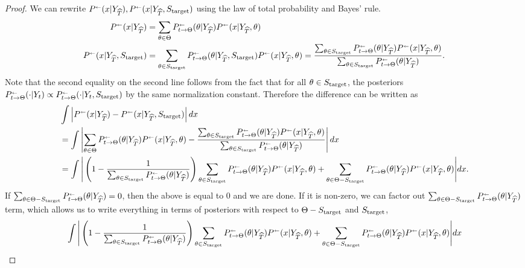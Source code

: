 \masterinequality*
\begin{proof}
We can rewrite  $\kernelreverse[](x| Y_{\wh{T}}), \kernelreverse[](x| Y_{\wh{T}},\Send)$ using the law of total probability and Bayes' rule. 
\begin{align*}
\kernelreverse[](x| Y_{\wh{T}}) &=\sum_{\theta \in \Theta} \kernelreverse[]_{t \to \Theta}(\theta|Y_{\wh{T}})\kernelreverse[](x|Y_{\wh{T}},\theta)\\
\kernelreverse[](x| Y_{\wh{T}},\Send) &=\sum_{\theta \in \Send} \kernelreverse[]_{t \to \Theta}(\theta|Y_{\wh{T}},\Send)\kernelreverse[](x|Y_{\wh{T}},\theta) = \frac{\sum_{\theta \in \Send} \kernelreverse[]_{t \to \Theta}(\theta|Y_{\wh{T}})\kernelreverse[](x|Y_{\wh{T}},\theta)}{\sum_{\theta \in \Send} \kernelreverse[]_{t \to \Theta}(\theta|Y_{\wh{T}})}.
\end{align*}
Note that the second equality on the second line follows from the fact that for all $\theta \in S_{\mathrm{target}}$, the posteriors $\kernelreverse[]_{t \to \Theta} (\cdot|Y_t) \propto \kernelreverse[]_{t \to \Theta}(\cdot|Y_t,\Send)$  by the same normalization constant. Therefore the difference can be written as 
\begin{align*}
&\int \left|\kernelreverse[](x| Y_{\wh{T}})-\kernelreverse[](x| Y_{\wh{T}},\Send)\right| dx \\
&= \int \left|\sum_{\theta \in \Theta} \kernelreverse[]_{t \to \Theta}(\theta|Y_{\wh{T}})\kernelreverse[](x|Y_{\wh{T}},\theta)-\frac{\sum_{\theta \in \Send} \kernelreverse[]_{t \to \Theta}(\theta|Y_{\wh{T}})\kernelreverse[](x|Y_{\wh{T}},\theta)}{\sum_{\theta \in \Send} \kernelreverse[]_{t \to \Theta}(\theta|Y_{\wh{T}})}\right| dx \\
&=  \int \Bigg|\left(1-\frac{1}{\sum_{\theta \in \Send} \kernelreverse[]_{t \to \Theta}(\theta|Y_{\wh{T}})}\right)\sum_{\theta \in \Send} \kernelreverse[]_{t \to \Theta}(\theta|Y_{\wh{T}})\kernelreverse[](x|Y_{\wh{T}},\theta) + \sum_{\theta \in \Theta-\Send} \kernelreverse[]_{t \to \Theta}(\theta|Y_{\wh{T}})\kernelreverse[](x|Y_{\wh{T}},\theta)\Bigg| dx. 
\end{align*}
If $\sum_{\theta \in \Theta-\Send} \kernelreverse[]_{t \to \Theta}(\theta|Y_{\wh{T}})=0$, then the above is equal to $0$ and we are done. If it is non-zero, we can factor out $\sum_{\theta \in \Theta-\Send} \kernelreverse[]_{t \to \Theta}(\theta|Y_{\wh{T}})$ term, which allows us to write everything in terms of posteriors with respect to $\Theta-S_{\mathrm{target}}$ and $S_{\mathrm{target}}$, 
\begin{align*}
&\int \Bigg|\left(1-\frac{1}{\sum_{\theta \in \Send} \kernelreverse[]_{t \to \Theta}(\theta|Y_{\wh{T}})}\right)\sum_{\theta \in \Send} \kernelreverse[]_{t \to \Theta}(\theta|Y_{\wh{T}})\kernelreverse[](x|Y_{\wh{T}},\theta) + \sum_{\theta \in \Theta-\Send} \kernelreverse[]_{t \to \Theta}(\theta|Y_{\wh{T}})\kernelreverse[](x|Y_{\wh{T}},\theta)\Bigg| dx\\

\end{align*}
\end{proof}

